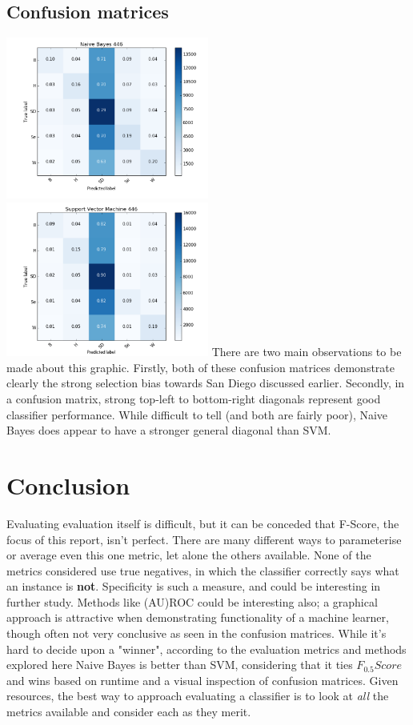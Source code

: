 \documentclass[twocolumn]{article}
\begin{document}
\subsection{Confusion matrices}
\includegraphics[width=0.5\textwidth]{confMatrixNB446Fixed}
\includegraphics[width=0.5\textwidth]{confMatrixSVM446Fixed}
There are two main observations to be made about this graphic. Firstly, both of these confusion matrices demonstrate clearly the strong selection bias towards San Diego discussed earlier. Secondly, in a confusion matrix, strong top-left to bottom-right diagonals  represent good classifier performance. While difficult to tell (and both are fairly poor), Naive Bayes does appear to have a stronger general diagonal than SVM.

\section{Conclusion}
Evaluating evaluation itself is difficult, but it can be conceded that F-Score, the focus of this report, isn't perfect. There are many different ways to parameterise or average even this one metric, let alone the others available. None of the metrics considered use true negatives, in which the classifier correctly says what an instance is \textbf{not}. Specificity is such a measure, and could be interesting in further study. Methods like (AU)ROC could be interesting also; a graphical approach is attractive when demonstrating functionality of a machine learner, though often not very conclusive as seen in the confusion matrices. While it's hard to decide upon a "winner", according to the evaluation metrics and methods explored here Naive Bayes is better than SVM, considering that it ties $F_{0.5}Score$ and wins based on runtime and a visual inspection of confusion matrices. Given resources, the best way to approach evaluating a classifier is to look at \textit{all} the metrics available and consider each as they merit.
\end{document}
